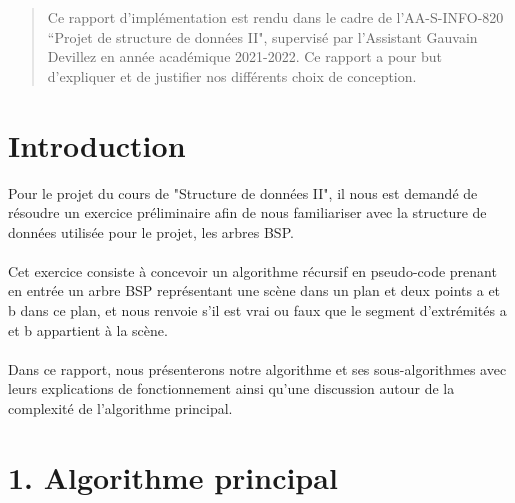 \documentclass[a4paper,12pt]{report}	%
\begin{document}

	\umonsCoverPage		%
	
	
	\begin{abstract}	%
Ce rapport d'implémentation est rendu dans le cadre de l'AA-S-INFO-820 ``Projet de structure de données II", supervisé par l'Assistant Gauvain Devillez en année académique 2021-2022. Ce rapport a pour but d'expliquer et de justifier nos différents choix de conception.
	\end{abstract}
	
	\clearpage			%
	\tableofcontents
	


	\clearpage			%
	
	{\section*{Introduction}}
\noindent Pour le projet du cours de "Structure de données II", il nous est demandé de résoudre un exercice préliminaire afin de nous familiariser avec la structure de données utilisée pour le projet, les arbres BSP.
\\ \\
\noindent Cet exercice consiste à concevoir un algorithme récursif en pseudo-code prenant en entrée un arbre BSP représentant une scène dans un plan et deux points a et b dans ce plan, et nous renvoie s'il est vrai ou faux que le segment d'extrémités a et b appartient à la scène.
\\ \\
\noindent Dans ce rapport, nous présenterons notre algorithme et ses sous-algorithmes avec leurs explications de fonctionnement ainsi qu'une discussion autour de la complexité de l'algorithme principal.

\newpage
	
	{\section*{1. Algorithme principal}}
\end{document}
